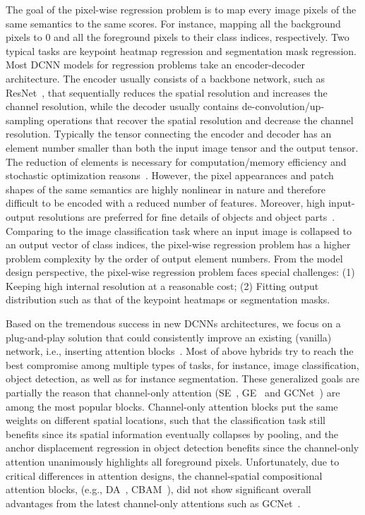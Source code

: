\documentclass[10pt,twocolumn,letterpaper]{article}
\begin{document}
The goal of the pixel-wise regression problem is to map every image pixels of the same semantics to the same scores. For instance, mapping all the background pixels to 0 and all the foreground pixels to their class indices, respectively. Two typical tasks are keypoint heatmap regression and segmentation mask regression. Most DCNN models for regression problems take an encoder-decoder architecture. The encoder usually consists of a backbone network, such as ResNet~\cite{He16}, that sequentially reduces the spatial resolution and increases the channel resolution, while the decoder usually contains de-convolution/up-sampling operations that recover the spatial resolution and decrease the channel resolution. Typically the tensor connecting the encoder and decoder has an element number smaller than both the input image tensor and the output tensor. The reduction of elements is necessary for computation/memory efficiency and stochastic optimization reasons~\cite{Goodfellow-et-al-2016}. However, the pixel appearances and patch shapes of the same semantics are highly nonlinear in nature and therefore difficult to be encoded with a reduced number of features. Moreover, high input-output resolutions are preferred for fine details of objects and object parts~\cite{Lin2017,Sun2019,Wang2020}. Comparing to the image classification task where an input image is collapsed to an output vector of class indices, the pixel-wise regression problem has a higher problem complexity by the order of output element numbers. From the model design perspective, the pixel-wise regression problem faces special challenges: (1) Keeping high internal resolution at a reasonable cost; (2) Fitting output distribution such as that of the keypoint heatmaps or segmentation masks.  

Based on the tremendous success in new DCNNs architectures, we focus on a plug-and-play solution that could consistently improve an existing (vanilla) network, i.e., inserting attention blocks~\cite{Vaswani17}\cite{Shaw18}\cite{Cordonnier20}\cite{Wang18nonlocal}\cite{Dai19}\cite{Xia19}\cite{Hu18b}\cite{Cao19}. Most of above hybrids try to reach the best compromise among multiple types of tasks, for instance, image classification, object detection, as well as for instance segmentation. These generalized goals are partially the reason that channel-only attention (SE~\cite{Hu18}, GE~\cite{Hu18b} and GCNet~\cite{Cao19}) are among the most popular blocks. Channel-only attention blocks put the same weights on different spatial locations, such that the classification task still benefits since its spatial information eventually collapses by pooling, and the anchor displacement regression in object detection benefits since the channel-only attention unanimously highlights all foreground pixels. Unfortunately, due to critical differences in attention designs, the channel-spatial compositional attention blocks, (e.g., DA~\cite{Fu2019}, CBAM~\cite{Sanghyun2018cbam}), did not show significant overall advantages from the latest channel-only attentions such as GCNet~\cite{Cao19}.  
\end{document}
